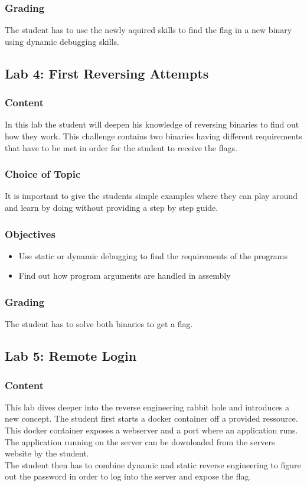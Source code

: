 \subsubsection*{Grading}
The student has to use the newly aquired skills to find the flag in a new binary using dynamic debugging skills.


\subsection{Lab 4: First Reversing Attempts}
\subsubsection*{Content}
In this lab the student will deepen his knowledge of reversing binaries to find out how they work. This challenge contains two binaries having different requirements that have to be met in order for the student to receive the flags.
\subsubsection*{Choice of Topic}
It is important to give the students simple examples where they can play around and learn by doing without providing a step by step guide.
\subsubsection*{Objectives}
\begin{itemize}
    \item Use static or dynamic debugging to find the requirements of the programs
    \item Find out how program arguments are handled in assembly
\end{itemize}
\subsubsection*{Grading}
The student has to solve both binaries to get a flag.


\subsection{Lab 5: Remote Login}
\subsubsection*{Content}
This lab dives deeper into the reverse engineering rabbit hole and introduces a new concept. The student first starts a docker container off a provided ressource.
This docker container exposes a webserver and a port where an application runs. The application running on the server can be downloaded from the servers website by the student. \\
The student then has to combine dynamic and static reverse engineering to figure out the password in order to log into the server and expose the flag.
